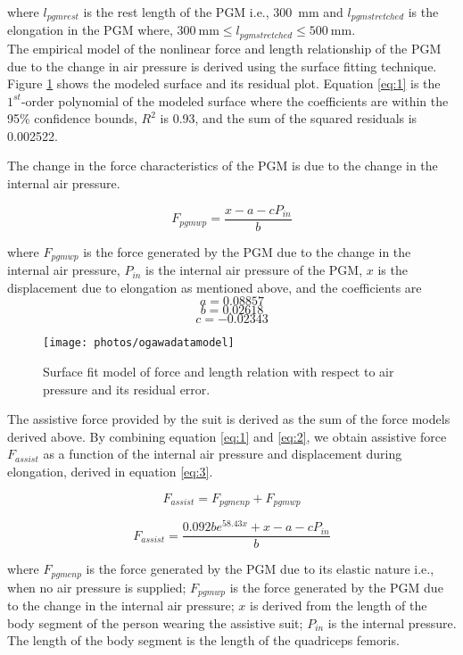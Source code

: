 \documentclass[paper,JRM,paper]{jaciiiarticle}
\begin{document}
where $l_{pgmrest}$ is the rest length of the PGM i.e., \SI{300}{\milli\meter} and $l_{pgmstretched}$ is the elongation in the PGM where, $\SI{300}{\milli\meter} \leq l_{pgmstretched} \leq \SI{500}{\milli\meter}$.\\

The empirical model of the nonlinear force and length relationship of the PGM due to the change in air pressure is derived using the surface fitting technique. Figure \ref{fig:ogawamodel} shows the modeled surface and its residual plot. Equation \ref{eq:1} is the $1^{st}$-order polynomial of the modeled surface where the coefficients are within the 95\% confidence bounds, $R^{2}$ is 0.93, and the sum of the squared residuals is 0.002522.

The change in the force characteristics of the PGM is due to the change in the internal air pressure. 

\begin{equation}\label{eq:2}
F_{pgmwp} =  \dfrac{x - a - cP_{in}}{b}
\end{equation}

where $F_{pgmwp}$ is the force generated by the PGM due to the change in the internal air pressure, $P_{in}$ is the internal air pressure of the PGM, $x$ is the displacement due to elongation as mentioned above, and the coefficients are
\[a = 0.08857\]
\[b= 0.02618\]
\[c=-0.02343\]

\begin{figure}[h]
	\centering
	\texttt{[image: photos/ogawadatamodel]}
	\caption{Surface fit model of force and length relation with respect to air pressure and its residual error.}
	\label{fig:ogawamodel}
\end{figure}

The assistive force provided by the suit is derived as the sum of the force models derived above. By combining equation \ref{eq:1} and \ref{eq:2}, we obtain assistive force $F_{assist}$ as a function of the internal air pressure and displacement during elongation, derived in equation \ref{eq:3}.

\[F_{assist} = F_{pgmenp} + F_{pgmwp}\]

\begin{equation}\label{eq:3}
F_{assist} =  \dfrac{0.092be^{58.43x} +x - a - cP_{in}}{b}
\end{equation}

where 
$F_{pgmenp}$ is the force generated by the PGM due to its elastic nature i.e., when no air pressure is supplied; 
$F_{pgmwp}$ is the force generated by the PGM due to the change in the internal air pressure;
$x$ is derived from the length of the body segment of the person wearing the assistive suit; $P_{in}$ is the internal pressure. The length of the body segment is the length of the quadriceps femoris. 
\end{document}
